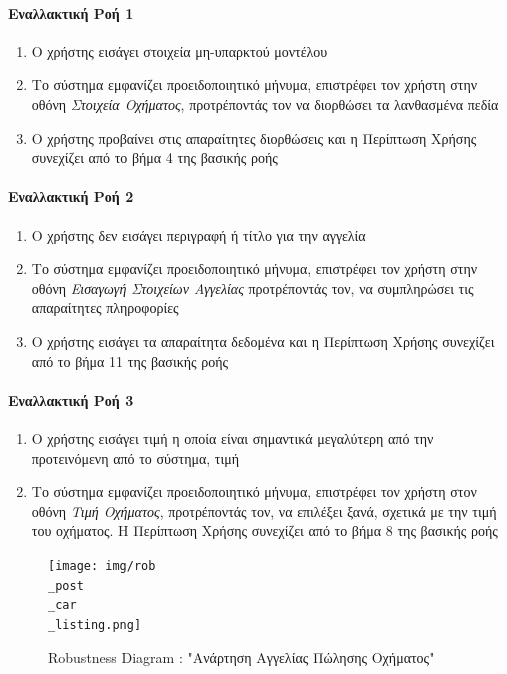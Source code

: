 \documentclass{../ol-softwaremanual}
\begin{document}
	\paragraph{Εναλλακτική Ροή 1}

	\begin{enumerate}
		\item O χρήστης εισάγει στοιχεία μη-υπαρκτού μοντέλου
		\item Το σύστημα εμφανίζει προειδοποιητικό μήνυμα, επιστρέφει τον χρήστη στην οθόνη \textit{Στοιχεία Οχήματος}, προτρέποντάς τον να διορθώσει τα λανθασμένα πεδία
		\item Ο χρήστης προβαίνει στις απαραίτητες διορθώσεις και η Περίπτωση Χρήσης συνεχίζει από το βήμα 4 της βασικής ροής
	\end{enumerate}

	\paragraph{Εναλλακτική Ροή 2}

	\begin{enumerate}
		\item Ο χρήστης δεν εισάγει περιγραφή ή τίτλο για την αγγελία
		\item Το σύστημα εμφανίζει προειδοποιητικό μήνυμα, επιστρέφει τον χρήστη στην οθόνη \textit{Εισαγωγή Στοιχείων Αγγελίας} προτρέποντάς τον, να συμπληρώσει τις απαραίτητες πληροφορίες
		\item Ο χρήστης εισάγει τα απαραίτητα δεδομένα και η Περίπτωση Χρήσης συνεχίζει από το βήμα 11 της βασικής ροής
	\end{enumerate}

	\paragraph{Εναλλακτική Ροή 3}

	\begin{enumerate}
		\item Ο χρήστης εισάγει τιμή η οποία είναι σημαντικά μεγαλύτερη από την προτεινόμενη από το σύστημα, τιμή
		\item Το σύστημα εμφανίζει προειδοποιητικό μήνυμα, επιστρέφει τον χρήστη στον οθόνη \textit{Τιμή Οχήματος}, προτρέποντάς τον, να επιλέξει ξανά, σχετικά με την τιμή του οχήματος. Η Περίπτωση Χρήσης συνεχίζει από το βήμα 8 της βασικής ροής
	\end{enumerate}
	
	\newpage 
	\begin{figure}[htbp!]
		\texttt{[image: img/rob\\\_post\\\_car\\\_listing.png]}
		\caption{\en Robustness Diagram : "\gr Ανάρτηση Αγγελίας Πώλησης Οχήματος\en"\gr\protect\footnotemark[1]}
	\end{figure}
\end{document}
